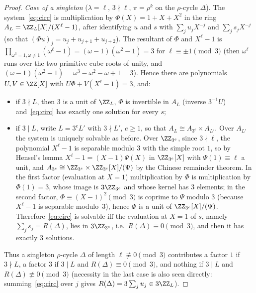 \begin{proof}
\emph{Case of a singleton} ($\lambda=\ell$, $3\nmid\ell$, $\pi=\rho^{k}$ on the $\rho$-cycle $\Delta$). The system~\eqref{eq:circ} is multiplication by $\Phi(X)=1+X+X^{2}$ in the ring $A_L=\ZZ_L[X]/(X^{\ell}-1)$, after identifying $u$ and $s$ with $\sum_j u_jX^{-j}$ and $\sum_j s_jX^{-j}$ (so that $(\Phi u)_j=u_j+u_{j+1}+u_{j+2}$). The resultant of $\Phi$ and $X^{\ell}-1$ is $\prod_{\omega^{3}=1,\omega\ne1}(\omega^{\ell}-1)=(\omega-1)(\omega^{2}-1)=3$ for $\ell\equiv\pm1\pmod3$ (then $\omega^{\ell}$ runs over the two primitive cube roots of unity, and $(\omega-1)(\omega^{2}-1)=\omega^{3}-\omega^{2}-\omega+1=3$). Hence there are polynomials $U,V\in\ZZ[X]$ with $U\Phi+V(X^{\ell}-1)=3$, and:
\begin{itemize}
\item if $3\nmid L$, then $3$ is a unit of $\ZZ_L$, $\Phi$ is invertible in $A_L$ (inverse $3^{-1}U$) and~\eqref{eq:circ} has exactly one solution for every $s$;
\item if $3\mid L$, write $L=3^{e}L'$ with $3\nmid L'$, $e\ge1$, so that $A_L\cong A_{3^{e}}\times A_{L'}$. Over $A_{L'}$ the system is uniquely solvable as before. Over $\ZZ_{3^{e}}$, since $3\nmid\ell$, the polynomial $X^{\ell}-1$ is separable modulo $3$ with the simple root $1$, so by Hensel's lemma $X^{\ell}-1=(X-1)\Psi(X)$ in $\ZZ_{3^{e}}[X]$ with $\Psi(1)\equiv\ell$ a unit, and $A_{3^{e}}\cong\ZZ_{3^{e}}\times\ZZ_{3^{e}}[X]/(\Psi)$ by the Chinese remainder theorem. In the first factor (evaluation at $X=1$) multiplication by $\Phi$ is multiplication by $\Phi(1)=3$, whose image is $3\ZZ_{3^{e}}$ and whose kernel has $3$ elements; in the second factor, $\Phi\equiv(X-1)^{2}\pmod 3$ is coprime to $\Psi$ modulo $3$ (because $X^{\ell}-1$ is separable modulo~$3$), hence $\Phi$ is a unit of $\ZZ_{3^{e}}[X]/(\Psi)$. Therefore~\eqref{eq:circ} is solvable iff the evaluation at $X=1$ of $s$, namely $\sum_j s_j=R(\Delta)$, lies in $3\ZZ_{3^{e}}$, i.e.\ $R(\Delta)\equiv0\pmod 3$, and then it has exactly $3$ solutions.
\end{itemize}
Thus a singleton $\rho$-cycle $\Delta$ of length $\ell\not\equiv0\pmod 3$ contributes a factor $1$ if $3\nmid L$, a factor $3$ if $3\mid L$ and $R(\Delta)\equiv0\pmod3$, and nothing if $3\mid L$ and $R(\Delta)\not\equiv0\pmod 3$ (necessity in the last case is also seen directly: summing~\eqref{eq:circ} over $j$ gives $R(\Delta)=3\sum_j u_j\in3\ZZ_L$).


\end{proof}
